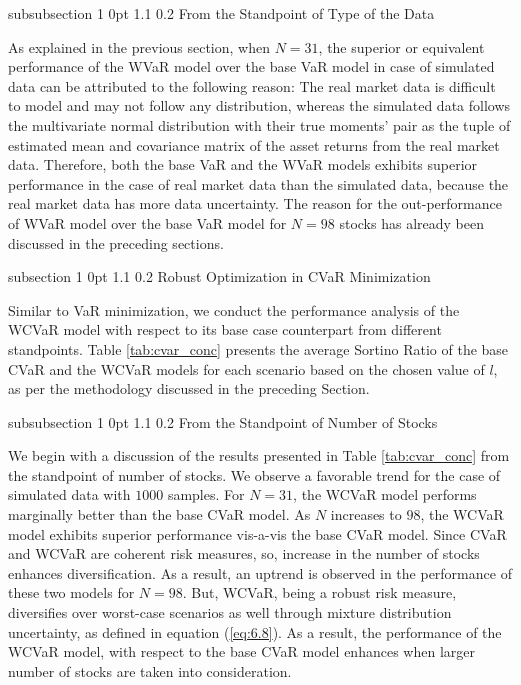 \documentclass[12pt]{article}
\makeatletter
\numberwithin{equation}{section}
\renewcommand{\subsection}{
  \@startsection
  {subsection}%
  {1}%
  {0pt}%
  {1.1\baselineskip}%
  {0.2\baselineskip}%
  {\sc \centering}%
}
\renewcommand{\subsubsection}{
  \@startsection
  {subsubsection}%
  {1}%
  {0pt}%
  {1.1\baselineskip}%
  {0.2\baselineskip}%
  {\sc \centering}%
}
\makeatother
\begin{document}
\subsubsection{From the Standpoint of Type of the Data}

As explained in the previous section, when $N=31$, the superior or equivalent performance of the WVaR model over the base VaR model in case of simulated data can be attributed to the following reason: The real market data is difficult to model and may not follow any distribution, whereas the simulated data follows the multivariate normal distribution with their true moments' pair as the tuple of estimated mean and covariance matrix of the asset returns from the real market data. Therefore, both the base VaR and the WVaR models exhibits superior performance in the case of real market data than the simulated data, because the real market data has more data uncertainty. The reason for the out-performance of WVaR model over the base VaR model for $N=98$ stocks has already been discussed in the preceding sections.

\subsection{Robust Optimization in CVaR Minimization}

Similar to VaR minimization, we conduct the performance analysis of the WCVaR model with respect to its base case counterpart from different standpoints. Table \ref{tab:cvar_conc} presents the average Sortino Ratio of the base CVaR and the WCVaR models for each scenario based on the chosen value of $l$, as per the methodology discussed in the preceding Section.

\subsubsection{From the Standpoint of Number of Stocks}

We begin with a discussion of the results presented in Table \ref{tab:cvar_conc} from the standpoint of number of stocks. We observe a favorable trend for the case of simulated data with $1000$ samples. For $N=31$, the WCVaR model performs marginally better than the base CVaR model. As $N$ increases to $98$, the WCVaR model exhibits superior performance vis-a-vis the base CVaR model. Since CVaR and WCVaR are coherent risk measures, so, increase in the number of stocks enhances diversification. As a result, an uptrend is observed in the performance of these two models for $N=98$. But, WCVaR, being a robust risk measure, diversifies over worst-case scenarios as well through mixture distribution uncertainty, as defined in equation (\ref{eq:6.8}). As a result, the performance of the WCVaR model, with respect to the base CVaR model enhances when larger number of stocks are taken into consideration.
\end{document}
